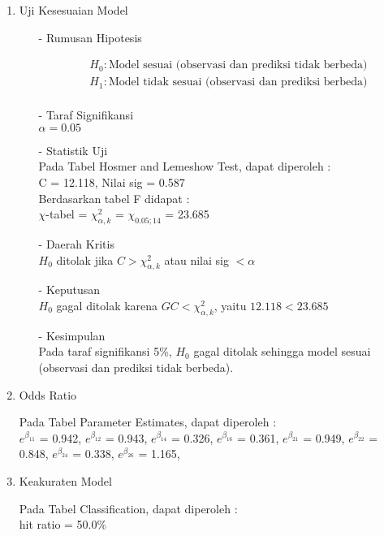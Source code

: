 \begin{enumerate}
    \item Uji Kesesuaian Model
    \begin{test}{
    \begin{enumerate}
        \item[-] Rumusan Hipotesis \\
        \begin{fleqn}[\parindent]
            \begin{equation*}
            \begin{split}
            &H_0 : \text{Model sesuai (observasi dan prediksi tidak berbeda)} \\ 
            &H_1 : \text{Model tidak sesuai (observasi dan prediksi berbeda)} \\
            \end{split}
            \end{equation*}
        \end{fleqn}
    
        \item[-] Taraf Signifikansi \\
        $\alpha = 0.05$
    
        \item[-] Statistik Uji \\
        Pada Tabel Hosmer and Lemeshow Test, dapat diperoleh : \\
        C = 12.118, Nilai sig = 0.587 \\
        Berdasarkan tabel F didapat : \\
        $\chi$-tabel = $\chi_{\alpha, k}^2$ = $\chi_{0.05; 14}$ = 23.685
    
        \item[-] Daerah Kritis \\
        $H_0$ ditolak jika $C > \chi_{\alpha, k}^2$ atau nilai sig $< \alpha$
    
        \item[-] Keputusan \\
        $H_0$ gagal ditolak karena $GC < \chi_{\alpha, k}^2$, yaitu $12.118 < 23.685$
    
        \item[-] Kesimpulan \\
        Pada taraf signifikansi 5\%, $H_0$ gagal ditolak sehingga model sesuai (observasi dan prediksi tidak berbeda).
    \end{enumerate}
    }
    \end{test}
    
    \item Odds Ratio
    \begin{test}{
        Pada Tabel Parameter Estimates, dapat diperoleh : \\
        $e^{\beta_{11}}$ = 0.942, $e^{\beta_{12}}$ = 0.943, $e^{\beta_{14}}$ = 0.326, $e^{\beta_{16}}$ = 0.361, $e^{\beta_{21}}$ = 0.949, $e^{\beta_{22}}$ = 0.848, $e^{\beta_{24}}$ = 0.338, $e^{\beta_{26}}$ = 1.165, 
    }
    \end{test}
    
    \item Keakuraten Model
    \begin{test}{
        Pada Tabel Classification, dapat diperoleh : \\
        hit ratio = 50.0\%
    }
    \end{test}

\end{enumerate} 
